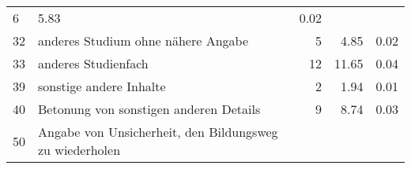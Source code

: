 \begin{longtable}{lXrrr}
       \num{6} &
       \num[round-mode=places,round-precision=2]{5.83} &
         \num[round-mode=places,round-precision=2]{0.02} \\

     32 &
     \multicolumn{1}{X}{ anderes Studium ohne nähere Angabe   } &


       \num{5} &
       \num[round-mode=places,round-precision=2]{4.85} &
         \num[round-mode=places,round-precision=2]{0.02} \\

     33 &
     \multicolumn{1}{X}{ anderes Studienfach   } &


       \num{12} &
       \num[round-mode=places,round-precision=2]{11.65} &
         \num[round-mode=places,round-precision=2]{0.04} \\

     39 &
     \multicolumn{1}{X}{ sonstige andere Inhalte   } &


       \num{2} &
       \num[round-mode=places,round-precision=2]{1.94} &
         \num[round-mode=places,round-precision=2]{0.01} \\

     40 &
     \multicolumn{1}{X}{ Betonung von sonstigen anderen Details   } &


       \num{9} &
       \num[round-mode=places,round-precision=2]{8.74} &
         \num[round-mode=places,round-precision=2]{0.03} \\

     50 &
     \multicolumn{1}{X}{ Angabe von Unsicherheit, den Bildungsweg zu wiederholen   } &



\end{longtable}

